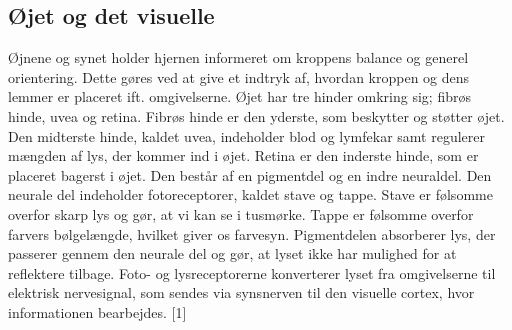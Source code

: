 \subsection{Øjet og det visuelle}
Øjnene og synet holder hjernen informeret om kroppens balance og generel orientering. Dette gøres ved at give et indtryk af, hvordan kroppen og dens lemmer er placeret ift. omgivelserne. Øjet har tre hinder omkring sig; fibrøs hinde, uvea og retina. Fibrøs hinde er den yderste, som beskytter og støtter øjet. Den midterste hinde, kaldet uvea, indeholder blod og lymfekar samt regulerer mængden af lys, der kommer ind i øjet. Retina er den inderste hinde, som er placeret bagerst i øjet. Den består af en pigmentdel og en indre neuraldel. Den neurale del indeholder fotoreceptorer, kaldet stave og tappe. Stave er følsomme overfor skarp lys og gør, at vi kan se i tusmørke. Tappe er følsomme overfor farvers bølgelængde, hvilket giver os farvesyn. Pigmentdelen absorberer lys, der passerer gennem den neurale del og gør, at lyset ikke har mulighed for at reflektere tilbage. Foto- og lysreceptorerne konverterer lyset fra omgivelserne til elektrisk nervesignal, som sendes via synsnerven til den visuelle cortex, hvor informationen bearbejdes. [1]  


